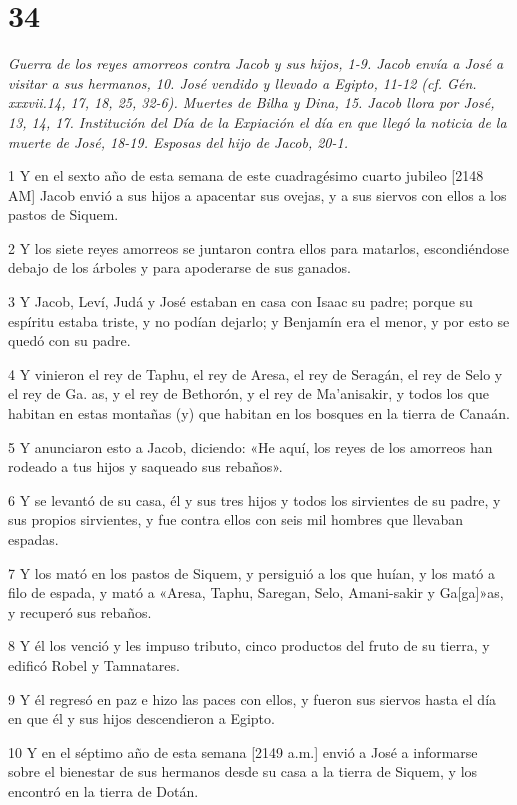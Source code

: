 \chapter{34}

\par \textit{Guerra de los reyes amorreos contra Jacob y sus hijos, 1-9. Jacob envía a José a visitar a sus hermanos, 10. José vendido y llevado a Egipto, 11-12 (cf. Gén. xxxvii.14, 17, 18, 25, 32-6). Muertes de Bilha y Dina, 15. Jacob llora por José, 13, 14, 17. Institución del Día de la Expiación el día en que llegó la noticia de la muerte de José, 18-19. Esposas del hijo de Jacob, 20-1.}

\par 1 Y en el sexto año de esta semana de este cuadragésimo cuarto jubileo [2148 AM] Jacob envió a sus hijos a apacentar sus ovejas, y a sus siervos con ellos a los pastos de Siquem.
\par 2 Y los siete reyes amorreos se juntaron contra ellos para matarlos, escondiéndose debajo de los árboles y para apoderarse de sus ganados.
\par 3 Y Jacob, Leví, Judá y José estaban en casa con Isaac su padre; porque su espíritu estaba triste, y no podían dejarlo; y Benjamín era el menor, y por esto se quedó con su padre.
\par 4 Y vinieron el rey de Taphu, el rey de Aresa, el rey de Seragán, el rey de Selo y el rey de Ga. as, y el rey de Bethorón, y el rey de Ma'anisakir, y todos los que habitan en estas montañas (y) que habitan en los bosques en la tierra de Canaán.
\par 5 Y anunciaron esto a Jacob, diciendo: «He aquí, los reyes de los amorreos han rodeado a tus hijos y saqueado sus rebaños».
\par 6 Y se levantó de su casa, él y sus tres hijos y todos los sirvientes de su padre, y sus propios sirvientes, y fue contra ellos con seis mil hombres que llevaban espadas.
\par 7 Y los mató en los pastos de Siquem, y persiguió a los que huían, y los mató a filo de espada, y mató a «Aresa, Taphu, Saregan, Selo, Amani-sakir y Ga[ga]»as, y recuperó sus rebaños.
\par 8 Y él los venció y les impuso tributo, cinco productos del fruto de su tierra, y edificó Robel y Tamnatares.
\par 9 Y él regresó en paz e hizo las paces con ellos, y fueron sus siervos hasta el día en que él y sus hijos descendieron a Egipto.
\par 10 Y en el séptimo año de esta semana [2149 a.m.] envió a José a informarse sobre el bienestar de sus hermanos desde su casa a la tierra de Siquem, y los encontró en la tierra de Dotán.
